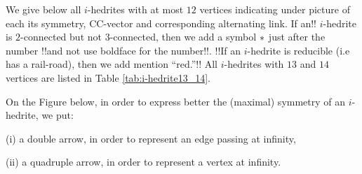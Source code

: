 \documentclass[12pt]{article}
\begin{document}
We give below all $i$-hedrites with at most $12$ vertices indicating under 
picture of each its symmetry, CC-vector and corresponding alternating link.
If an!! $i$-hedrite is $2$-connected but not $3$-connected, then we add
a symbol ${\bf *}$ just after the number 
!!and not use boldface for the number!!.
!!If an $i$-hedrite is reducible (i.e has a rail-road), then we
add mention ``red.''!!
All $i$-hedrites with $13$
and $14$ vertices are listed in Table \ref{tab:i-hedrite13_14}. 


On the Figure below, in order to express better the (maximal)
symmetry of an $i$-hedrite, we put:

(i) a double arrow, in order to represent an edge passing at infinity,

(ii) a quadruple arrow, in order to represent a vertex at infinity.
\end{document}

